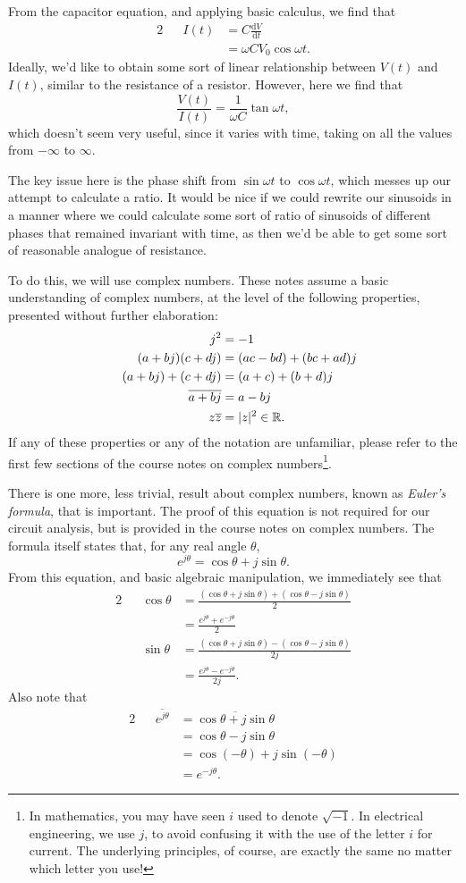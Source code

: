 \documentclass[letterpaper]{article}
\theoremstyle{remark}
\newcommand{\dt}{\mathrm{d}t}
\newcommand{\diff}{\mathrm{d}}
\DeclarePairedDelimiter\abs{\lvert}{\rvert}%
\newcommand{\eqn}[1]{\begin{alignat*}{2}#1\end{alignat*}}
\begin{document}
From the capacitor equation, and applying basic calculus, we find that
\eqn{
    && I(t) &= C \frac{\diff V}{\dt} \\
    &&&= \omega C V_0 \cos{\omega t}.
}
Ideally, we'd like to obtain some sort of linear relationship between $V(t)$ and $I(t)$, similar to the resistance of a resistor. However, here we find that
\[
    \frac{V(t)}{I(t)} = \frac{1}{\omega C} \tan{\omega t},
\]
which doesn't seem very useful, since it varies with time, taking on all the values from $-\infty$ to $\infty$.

The key issue here is the phase shift from $\sin{\omega t}$ to $\cos{\omega t}$, which messes up our attempt to calculate a ratio. It would be nice if we could rewrite our sinusoids in a manner where we could calculate some sort of ratio of sinusoids of different phases that remained invariant with time, as then we'd be able to get some sort of reasonable analogue of resistance.

To do this, we will use complex numbers. These notes assume a basic understanding of complex numbers, at the level of the following properties, presented without further elaboration:
\eqn{
    && j^2 &= -1 \\
    && (a + bj) (c + dj) &= (ac - bd) + (bc + ad)j \\
    && (a + bj) + (c + dj) &= (a + c) + (b + d)j \\
    && \overline{a + bj} &= a - bj \\
    && z\overline{z} &= \abs{z}^2 \in \mathbb{R}.
}
If any of these properties or any of the notation are unfamiliar, please refer to the first few sections of the course notes on complex numbers\footnote{In mathematics, you may have seen $i$ used to denote $\sqrt{-1}$. In electrical engineering, we use $j$, to avoid confusing it with the use of the letter $i$ for current. The underlying principles, of course, are exactly the same no matter which letter you use!}.

There is one more, less trivial, result about complex numbers, known as \emph{Euler's formula}, that is important. The proof of this equation is not required for our circuit analysis, but is provided in the course notes on complex numbers. The formula itself states that, for any real angle $\theta$,
\[
    e^{j\theta} = \cos{\theta} + j\sin{\theta}.
\]
From this equation, and basic algebraic manipulation, we immediately see that
\eqn{
    && \cos{\theta} &= \frac{(\cos{\theta} + j\sin{\theta}) + (\cos{\theta} - j\sin{\theta})}{2} \\
    &&&= \frac{e^{j\theta} + e^{-j\theta}}{2} \\
    && \sin{\theta} &= \frac{(\cos{\theta} + j\sin{\theta}) - (\cos{\theta} - j\sin{\theta})}{2j} \\
    &&&= \frac{e^{j\theta} - e^{-j\theta}}{2j}.
}
Also note that
\eqn{
    && \overline{e^{j\theta}} &= \overline{\cos{\theta} + j\sin{\theta}} \\
    &&&= \cos{\theta} - j\sin{\theta} \\
    &&&= \cos{(-\theta)} + j\sin{(-\theta)} \\
    &&&= e^{-j\theta}.
}
\end{document}
